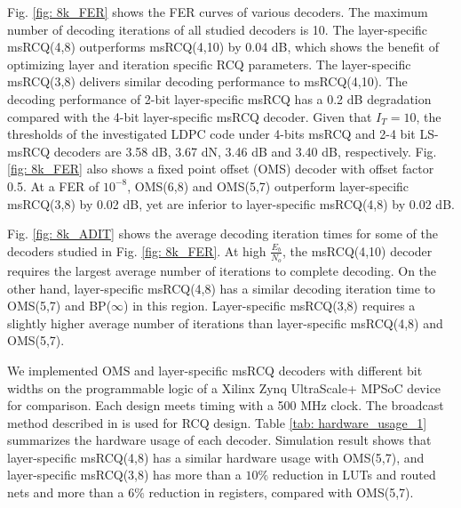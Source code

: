 \documentclass [PhD] {uclathes}
\begin{document}
Fig. \ref{fig: 8k_FER} shows the FER curves of various decoders. The maximum number of decoding iterations of all studied decoders is 10. The layer-specific msRCQ(4,8) outperforms msRCQ(4,10) by 0.04 dB, which shows the benefit of optimizing layer and iteration specific RCQ parameters.  
The layer-specific msRCQ(3,8) delivers similar decoding performance to msRCQ(4,10). The decoding performance of 2-bit layer-specific msRCQ has a 0.2 dB degradation compared with the 4-bit  layer-specific msRCQ decoder. 
Given that  $I_T=10$, the thresholds of the investigated LDPC code under 4-bits msRCQ and 2-4 bit LS-msRCQ decoders  are 3.58 dB, 3.67 dN,  3.46 dB  and 3.40 dB, respectively. 
Fig. \ref{fig: 8k_FER} also shows a fixed point offset \minsum (OMS) decoder with offset factor 0.5. At a FER of $10^{-8}$, OMS(6,8) and OMS(5,7) outperform layer-specific msRCQ(3,8) by 0.02 dB, yet are inferior to layer-specific msRCQ(4,8) by 0.02 dB.  

Fig. \ref{fig: 8k_ADIT} shows the average decoding iteration times for some of the decoders studied in Fig. \ref{fig: 8k_FER}. At high $\frac{E_b}{N_o}$, the msRCQ(4,10) decoder requires the largest average number of iterations to complete decoding. On the other hand, layer-specific msRCQ(4,8) has a similar decoding iteration time to OMS(5,7) and BP($\infty$) in this region. Layer-specific msRCQ(3,8) requires a slightly higher average number of iterations than layer-specific msRCQ(4,8) and OMS(5,7). 

We implemented OMS and layer-specific msRCQ decoders with different bit widths on the programmable logic of a Xilinx Zynq UltraScale+ MPSoC device for comparison. Each design meets timing with a 500 MHz clock. The broadcast method described in \cite{Terrill2021-ec} is used for RCQ design. 
Table \ref{tab: hardware_usage_1} summarizes the hardware usage of each decoder. 
Simulation result shows that layer-specific msRCQ(4,8) has a similar hardware usage with OMS(5,7), and layer-specific msRCQ(3,8) has more than a $10\%$ reduction in LUTs and routed nets and more than a $6\%$ reduction in registers, compared with OMS(5,7).
\end{document}
